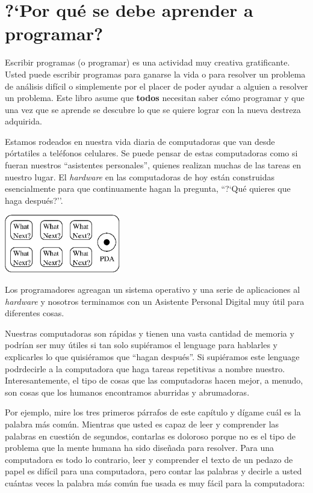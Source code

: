 \chapter{?`Por qu\'e se debe aprender a programar?}

Escribir programas (o programar) es una actividad muy creativa gratificante. Usted puede escribir programas para ganarse la vida o para resolver un problema de an\'alisis dif\'icil o simplemente por el placer de poder ayudar a alguien a resolver un problema. Este libro asume que \textbf{todos} necesitan saber cómo programar y que una vez que se aprende se descubre lo que se quiere lograr con la nueva destreza adquirida.  

Estamos rodeados en nuestra vida diaria de computadoras que van desde p\'ortatiles a tel\'efonos celulares. Se puede pensar de estas computadoras como si fueran nuestros ``asistentes personales'', quienes realizan muchas de las tareas en nuestro lugar. El \textit{hardware} en las computadoras de hoy est\'an construidas esencialmente para que continuamente hagan la pregunta, 
``?`Qu\'e quieres que haga despu\'es?''.

\beforefig
\centerline{\includegraphics[height=1.00in]{figs2/pda.eps}}
\afterfig

Los programadores agreagan un sistema operativo y una serie de aplicaciones al \textit{hardware} y nosotros terminamos con un Asistente Personal Digital muy \'util para diferentes cosas.

Nuestras computadoras son r\'apidas y tienen una vasta cantidad de memoria y podr\'ian ser muy \'utiles si tan solo supi\'eramos el lenguage para hablarles y explicarles lo que quisi\'eramos que ``hagan despu\'es''. Si supi\'eramos este lenguage podr\iamos decirle a la computadora que haga tareas repetitivas a nombre nuestro. Interesantemente, el tipo de cosas que las computadoras hacen mejor, a menudo, son cosas que los humanos encontramos aburridas y abrumadoras.

Por ejemplo, mire los tres primeros p\'arrafos de este cap\'itulo y d\'igame cu\'al es la palabra m\'as com\'un. Mientras que usted es capaz de leer y comprender las palabras en cuesti\'on de segundos, contarlas es doloroso porque no es el tipo de problema que la mente humana ha sido dise\~nada para resolver. Para una computadora es todo lo contrario, leer y comprender el texto de un pedazo de papel es dif\'icil para una computadora, pero contar las palabras y decirle a usted cu\'antas veces la palabra m\'as com\'un fue usada es muy f\'acil para la computadora:

